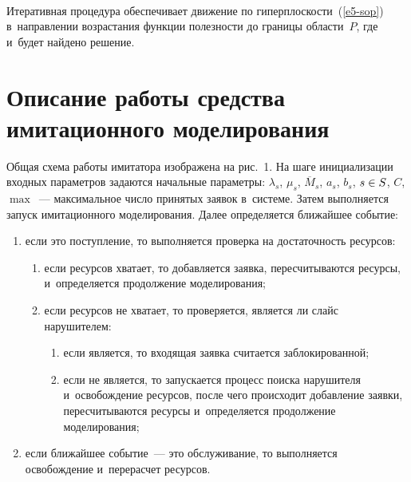 \begin{multicols}{2}
  \begin{figure*}[b] %
\vspace*{-4pt}
 \begin{center}
 \mbox{%
 \epsfxsize=159.488mm 
 }
 \end{center}
   \vspace*{-9pt}
\end{figure*}
  
  Итеративная процедура обеспечивает движение по  
гиперплоскости~(\ref{e5-sop}) в~направлении возрастания функции полезности 
до границы области~$P$, где и~будет найдено решение.

\vspace*{-6pt}
  
  \section{Описание работы средства имитационного моделирования}
  
  \vspace*{-3pt}
  
  Общая схема работы имитатора изображена на рис.~1. На шаге 
инициализации входных па\-ра\-мет\-ров задаются начальные параметры: 
$\lambda_s$, $\mu_s$, $\overline{M}_s$, $a_s$, $b_s$, $s\hm\in S$, $C$, $\max$~--- 
максимальное число принятых заявок в~системе. Затем выполняется запуск 
имитационного моделирования. Далее определяется ближайшее событие: 

\begin{enumerate}[(1)]
\item если это поступление, то выполняется проверка на достаточность ресурсов:
\begin{enumerate}[({1}.1)] 
\item если ресурсов хватает, то добавляется заявка, пересчитываются ресурсы, 
и~определяется продолжение моделирования; 
\item если ресурсов не хватает, то 
проверяется, является ли слайс нарушителем: 
\begin{enumerate}[({1.2.}1)]
\item если является, то входящая 
заявка считается заблокированной; 
\item если не является, то запускается 
процесс поиска нарушителя и~освобождение ресурсов, после чего происходит 
добавление заявки, пересчитываются ресурсы и~определяется продолжение 
моделирования;
\end{enumerate}
\end{enumerate}
\item если ближайшее событие~--- это обслуживание, то 
выполняется освобождение и~перерасчет ресурсов.
\end{enumerate}


\end{multicols}
